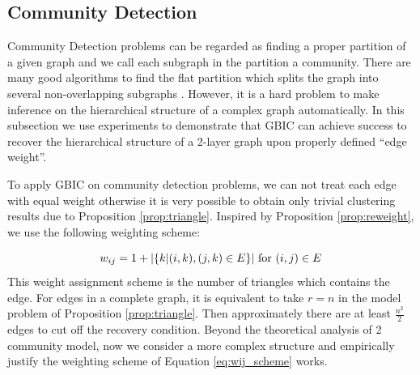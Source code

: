 \subsection{Community Detection}\label{subsec:cd}
Community Detection problems can be regarded as finding a proper partition of a given graph and we call each subgraph in the partition a community. There are many good algorithms
to find the flat partition which splits the graph into several non-overlapping subgraphs \citep{malliaros2013clustering}. However, it is a hard problem to make inference on the hierarchical structure of a complex graph automatically.
In this subsection we use experiments to demonstrate that GBIC
can achieve success to recover the hierarchical structure of a 2-layer graph upon properly defined ``edge weight''.

To apply GBIC on community detection problems, we can not treat each edge with equal weight otherwise it is very possible to obtain only trivial clustering results due to Proposition \ref{prop:triangle}. Inspired by Proposition \ref{prop:reweight}, we use the following weighting scheme:

\begin{equation}\label{eq:wij_scheme}
    w_{ij} = 1 + \lvert\{k | (i,k),(j,k) \in E \}\rvert \textrm{ for } (i,j) \in E
\end{equation}
This weight assignment scheme is the number of triangles which contains the edge. For edges in a complete graph, it is equivalent to take $r=n$ in the model problem of Proposition \ref{prop:triangle}. Then approximately there are
at least $\frac{n^2}{2}$ edges to cut off the recovery condition.
Beyond the theoretical analysis of 2 community model, now we consider a more complex structure and empirically justify the weighting scheme of Equation 
\eqref{eq:wij_scheme} works.

